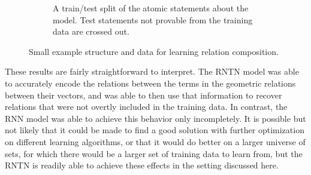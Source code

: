 \begin{figure}[tp]
\begin{subfigure}[t]{0.43\textwidth}
    \caption{A train/test split of the atomic statements about the
      model.  Test statements not provable from the training data are
      crossed out.}
  \end{subfigure}  
  \caption{Small example structure and data for learning relation composition.}
  \label{lattice-figure}
\end{figure} 





These results are fairly straightforward to interpret. The RNTN model
was able to accurately encode the relations between the terms in the
geometric relations between their vectors, and was able to then use
that information to recover relations that were not overtly included
in the training data. In contrast, the RNN model was able to achieve
this behavior only incompletely. It is possible but not likely that it
could be made to find a good solution with further optimization on
different learning algorithms, or that it would do better on a larger
universe of sets, for which there would be a larger set of training
data to learn from, but the RNTN is readily able to achieve these
effects in the setting discussed here.

